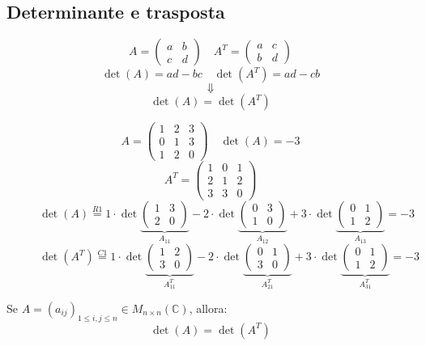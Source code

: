 \documentclass[a4paper]{article}
\theoremstyle{break}
\theoremstyle{break}
\theoremstyle{break}
\theoremstyle{break}
\begin{document}
\subsection{Determinante e trasposta}
\[
A = \begin{pmatrix} 
  a & b\\
  c & d
\end{pmatrix} 
\quad
A^T = \begin{pmatrix} 
  a & c\\
  b & d
\end{pmatrix}
\] 
\[
\det(A) = ad-bc \quad \det(A^T) = ad-cb
\] 
\[
\Downarrow
\] 
\[
\det(A) = \det(A^T)
\] 
\begin{figure}[H]
  \begin{example}
    \[
    A = \begin{pmatrix} 
      1 & 2 & 3\\
      0 & 1 & 3\\
      1 & 2 & 0
    \end{pmatrix} 
    \quad \det(A) = -3
    \] 
    \[
    A^T = \begin{pmatrix} 
      1 & 0 & 1\\
      2 & 1 & 2\\
      3 & 3 & 0
    \end{pmatrix}
    \] 
    \[
      \det(A) \stackrel{R1}{=} 1 \cdot \det\underbrace{\begin{pmatrix} 
        1 & 3\\
        2 & 0
    \end{pmatrix}}_{A_{11}}
    - 2 \cdot \det\underbrace{\begin{pmatrix} 
        0 & 3\\
        1 & 0
    \end{pmatrix}}_{A_{12}}
    + 3 \cdot \det\underbrace{\begin{pmatrix} 
        0 & 1\\
        1 & 2
    \end{pmatrix}}_{A_{13}} = -3
    \] 
    \[
    \det(A^T) \stackrel{C1}{=} 1 \cdot \det\underbrace{\begin{pmatrix} 
      1 & 2\\
      3 & 0
    \end{pmatrix}}_{A^T_{11}}
    - 2 \cdot \det\underbrace{\begin{pmatrix} 
      0 & 1\\
      3 & 0
    \end{pmatrix}}_{A^T_{21}}
    + 3 \cdot \det\underbrace{\begin{pmatrix} 
      0 & 1\\
      1 & 2
    \end{pmatrix}}_{A^T_{31}} = -3
    \] 
  \end{example}
\end{figure}
Se \( A = (a_{ij})_{1 \le i,j \le n} \in M_{n \times n}(\mathbb{C}) \), allora:
\[
\det(A) = \det(A^T)
\] 
\end{document}
